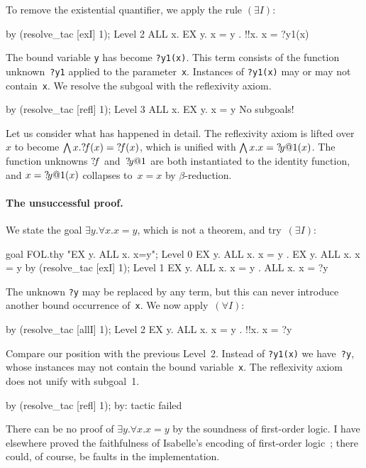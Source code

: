 To remove the existential quantifier, we apply the rule $(\exists I)$:
\begin{ttbox}
by (resolve_tac [exI] 1);
{\out Level 2}
{\out ALL x. EX y. x = y}
{. !!x. x = ?y1(x)}
\end{ttbox}
The bound variable {\tt y} has become {\tt?y1(x)}.  This term consists of
the function unknown~{\tt?y1} applied to the parameter~{\tt x}.
Instances of {\tt?y1(x)} may or may not contain~{\tt x}.  We resolve the
subgoal with the reflexivity axiom.
\begin{ttbox}
by (resolve_tac [refl] 1);
{\out Level 3}
{\out ALL x. EX y. x = y}
{\out No subgoals!}
\end{ttbox}
Let us consider what has happened in detail.  The reflexivity axiom is
lifted over~$x$ to become $\bigwedge x.{?\!f}(x)={?\!f}(x)$, which is
unified with $\bigwedge x.x={?\!y@1}(x)$.  The function unknowns ${?\!f}$
and~${?\!y@1}$ are both instantiated to the identity function, and
$x={?\!y@1}(x)$ collapses to~$x=x$ by $\beta$-reduction.

\paragraph{The unsuccessful proof.}
We state the goal $\exists y.\forall x.x=y$, which is not a theorem, and
try~$(\exists I)$:
\begin{ttbox}
goal FOL.thy "EX y. ALL x. x=y";
{\out Level 0}
{\out EX y. ALL x. x = y}
{. EX y. ALL x. x = y}
\ttbreak
by (resolve_tac [exI] 1);
{\out Level 1}
{\out EX y. ALL x. x = y}
{. ALL x. x = ?y}
\end{ttbox}
The unknown {\tt ?y} may be replaced by any term, but this can never
introduce another bound occurrence of~{\tt x}.  We now apply~$(\forall I)$:
\begin{ttbox}
by (resolve_tac [allI] 1);
{\out Level 2}
{\out EX y. ALL x. x = y}
{. !!x. x = ?y}
\end{ttbox}
Compare our position with the previous Level~2.  Instead of {\tt?y1(x)} we
have~{\tt?y}, whose instances may not contain the bound variable~{\tt x}.
The reflexivity axiom does not unify with subgoal~1.
\begin{ttbox}
by (resolve_tac [refl] 1);
{\out by: tactic failed}
\end{ttbox}
There can be no proof of $\exists y.\forall x.x=y$ by the soundness of
first-order logic.  I have elsewhere proved the faithfulness of Isabelle's
encoding of first-order logic~\cite{paulson-found}; there could, of course, be
faults in the implementation.


